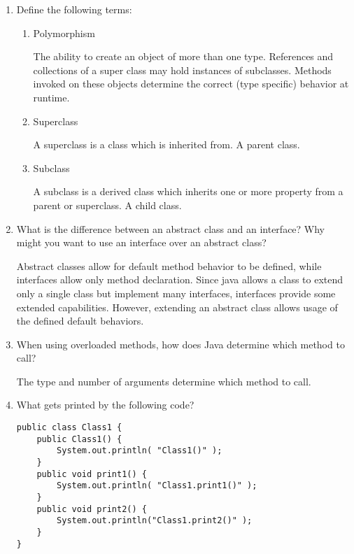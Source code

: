 \documentclass[11pt]{article}
\newenvironment{answer}{\large\lstset{basicstyle=\large}\color{white}}{}
\newenvironment{answer}{\large\lstset{basicstyle=\large}\color{red}}{}
\begin{document}
\begin{enumerate}
\item Define the following terms:
    \begin{enumerate}
    \item Polymorphism

        \begin{answer}
        The ability to create an object of more than one type. References and collections of a super class may hold instances of subclasses. Methods invoked on these objects determine the correct (type specific) behavior at runtime. 
        \end{answer}

    \item Superclass

        \begin{answer}
A superclass is a class which is inherited from. A parent class.
        \end{answer}

    \item Subclass

        \begin{answer}
A subclass is a derived class which inherits one or more property from a parent or superclass. A child class.
        \end{answer}
    \end{enumerate}

\item What is the difference between an abstract class and an interface? Why
      might you want to use an interface over an abstract class?

      \begin{answer}
    Abstract classes allow for default method behavior to be defined, while interfaces allow only method declaration. Since java allows a class to extend only a single class but implement many interfaces, interfaces provide some extended capabilities. However, extending an abstract class allows usage of the defined default behaviors. 
     \end{answer}

\item When using overloaded methods, how does Java determine which method to
      call?

    \begin{answer}
The type and number of arguments determine which method to call.
    \end{answer}

\pagebreak
\item What gets printed by the following code?
\begin{lstlisting}
public class Class1 {
	public Class1() {
		System.out.println( "Class1()" );
	}
	public void print1() {
		System.out.println( "Class1.print1()" );
	}
	public void print2() {
		System.out.println("Class1.print2()" );
	}
}


\end{lstlisting}
\end{enumerate}
\end{document}
